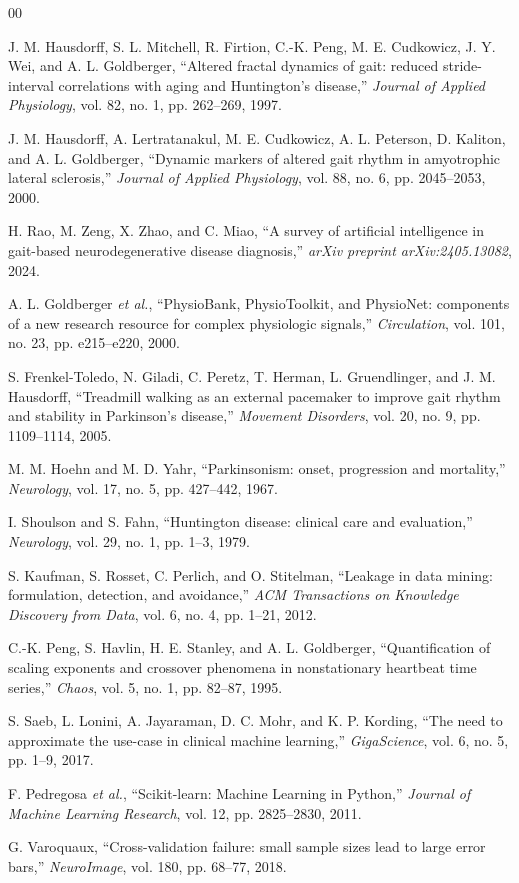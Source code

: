 \documentclass[conference]{IEEEtran}
\begin{document}
\balance
\begin{thebibliography}{00}

J. M. Hausdorff, S. L. Mitchell, R. Firtion, C.-K. Peng, M. E. Cudkowicz, J. Y. Wei, and A. L. Goldberger, ``Altered fractal dynamics of gait: reduced stride-interval correlations with aging and Huntington's disease,'' \textit{Journal of Applied Physiology}, vol. 82, no. 1, pp. 262--269, 1997.

J. M. Hausdorff, A. Lertratanakul, M. E. Cudkowicz, A. L. Peterson, D. Kaliton, and A. L. Goldberger, ``Dynamic markers of altered gait rhythm in amyotrophic lateral sclerosis,'' \textit{Journal of Applied Physiology}, vol. 88, no. 6, pp. 2045--2053, 2000.

H. Rao, M. Zeng, X. Zhao, and C. Miao, ``A survey of artificial intelligence in gait-based neurodegenerative disease diagnosis,'' \textit{arXiv preprint arXiv:2405.13082}, 2024.

A. L. Goldberger \textit{et al.}, ``PhysioBank, PhysioToolkit, and PhysioNet: components of a new research resource for complex physiologic signals,'' \textit{Circulation}, vol. 101, no. 23, pp. e215--e220, 2000.

S. Frenkel-Toledo, N. Giladi, C. Peretz, T. Herman, L. Gruendlinger, and J. M. Hausdorff, ``Treadmill walking as an external pacemaker to improve gait rhythm and stability in Parkinson's disease,'' \textit{Movement Disorders}, vol. 20, no. 9, pp. 1109--1114, 2005.

M. M. Hoehn and M. D. Yahr, ``Parkinsonism: onset, progression and mortality,'' \textit{Neurology}, vol. 17, no. 5, pp. 427--442, 1967.

I. Shoulson and S. Fahn, ``Huntington disease: clinical care and evaluation,'' \textit{Neurology}, vol. 29, no. 1, pp. 1--3, 1979.

S. Kaufman, S. Rosset, C. Perlich, and O. Stitelman, ``Leakage in data mining: formulation, detection, and avoidance,'' \textit{ACM Transactions on Knowledge Discovery from Data}, vol. 6, no. 4, pp. 1--21, 2012.

C.-K. Peng, S. Havlin, H. E. Stanley, and A. L. Goldberger, ``Quantification of scaling exponents and crossover phenomena in nonstationary heartbeat time series,'' \textit{Chaos}, vol. 5, no. 1, pp. 82--87, 1995.

S. Saeb, L. Lonini, A. Jayaraman, D. C. Mohr, and K. P. Kording, ``The need to approximate the use-case in clinical machine learning,'' \textit{GigaScience}, vol. 6, no. 5, pp. 1--9, 2017.

F. Pedregosa \textit{et al.}, ``Scikit-learn: Machine Learning in Python,'' \textit{Journal of Machine Learning Research}, vol. 12, pp. 2825--2830, 2011.

G. Varoquaux, ``Cross-validation failure: small sample sizes lead to large error bars,'' \textit{NeuroImage}, vol. 180, pp. 68--77, 2018.

\end{thebibliography}
\end{document}
